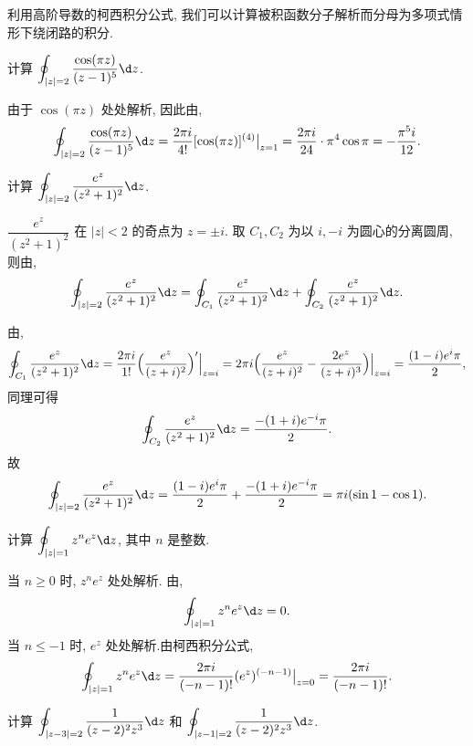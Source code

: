 利用高阶导数的柯西积分公式, 我们可以计算被积函数分子解析而分母为多项式情形下绕闭路的积分.

\begin{example}
  计算 $\displaystyle\oint_{|z|=2}\frac{\cos(\pi z)}{(z-1)^5}\d z$.
\end{example}

\begin{solution}
  由于 $\cos(\pi z)$ 处处解析,
  因此由\thmCIH,
  \[
    \oint_{|z|=2}\frac{\cos(\pi z)}{(z-1)^5}\d z
    =\frac{2\pi i}{4!}[\cos(\pi z)]^{(4)}\big|_{z=1}
    =\frac{2\pi i}{24}\cdot \pi^4\cos \pi=-\frac{\pi^5 i}{12}.
  \]
\end{solution}

\begin{example}
  计算 $\displaystyle\oint_{|z|=2}\frac{e^z}{(z^2+1)^2}\d z$.
\end{example}

\begin{solution}
  $\dfrac{e^z}{(z^2+1)^2}$ 在 $|z|<2$ 的奇点为 $z=\pm i$.
  取 $C_1,C_2$ 为以 $i,-i$ 为圆心的分离圆周, 则由\thmCCC,
  \[
     \oint_{|z|=2}\frac{e^z}{(z^2+1)^2}\d z
    =\oint_{C_1}\frac{e^z}{(z^2+1)^2}\d z
    +\oint_{C_2}\frac{e^z}{(z^2+1)^2}\d z.
  \]

  由\thmCIH,
  \[
     \oint_{C_1}\frac{e^z}{(z^2+1)^2}\d z
    =\frac{2\pi i}{1!}\Bigl(\frac{e^z}{(z+i)^2}\Bigr)'\Big|_{z=i}
    =2\pi i\Bigl(\frac{e^z}{(z+i)^2}-\frac{2e^z}{(z+i)^3}\Bigr)\Big|_{z=i}
    =\frac{(1-i)e^i\pi}2,
  \]
  同理可得
  \[
    \oint_{C_2}\frac{e^z}{(z^2+1)^2}\d z=\frac{-(1+i)e^{-i}\pi}2.
  \]
  故
  \[
     \oint_{|z|=2}\frac{e^z}{(z^2+1)^2}\d z
    =\frac{(1-i)e^i\pi}2+\frac{-(1+i)e^{-i}\pi}2
    =\pi i(\sin1-\cos1).
  \]
\end{solution}

\begin{example}
  计算 $\displaystyle\oint_{|z|=1}z^ne^z\d z$, 其中 $n$ 是整数.
\end{example}

\begin{solution}
  当 $n\ge 0$ 时, $z^ne^z$ 处处解析.
  由\thmCG, 
  \[
    \oint_{|z|=1}z^ne^z\d z=0.
  \]
  当 $n\le-1$ 时, $e^z$ 处处解析.由柯西积分公式,
  \[
     \oint_{|z|=1}z^ne^z\d z
    =\frac{2\pi i}{(-n-1)!}(e^z)^{(-n-1)}\big|_{z=0}
    =\frac{2\pi i}{(-n-1)!}.
  \]
\end{solution}

\begin{example}
  计算 $\displaystyle\oint_{|z-3|=2}\frac1{(z-2)^2z^3}\d z$ 和 $\displaystyle\oint_{|z-1|=2}\frac1{(z-2)^2z^3}\d z$.
\end{example}


